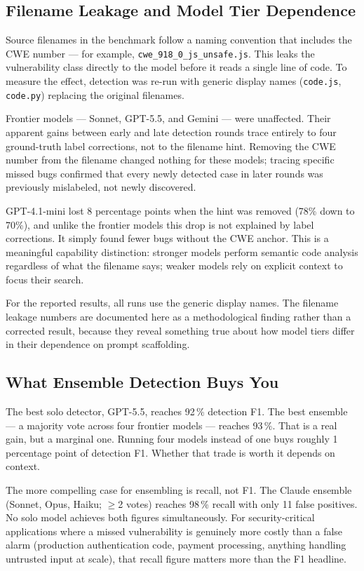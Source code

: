 \documentclass[12pt]{article}
\begin{document}
\subsection{Filename Leakage and Model Tier Dependence}

Source filenames in the benchmark follow a naming convention that includes the
CWE number — for example, \texttt{cwe\_918\_0\_js\_unsafe.js}. This leaks
the vulnerability class directly to the model before it reads a single line of
code. To measure the effect, detection was re-run with generic display names
(\texttt{code.js}, \texttt{code.py}) replacing the original filenames.

Frontier models — Sonnet, GPT-5.5, and Gemini — were unaffected. Their
apparent gains between early and late detection rounds trace entirely to four
ground-truth label corrections, not to the filename hint. Removing the CWE
number from the filename changed nothing for these models; tracing specific
missed bugs confirmed that every newly detected case in later rounds was
previously mislabeled, not newly discovered.

GPT-4.1-mini lost 8 percentage points when the hint was removed (78\% down
to 70\%), and unlike the frontier models this drop is not explained by label
corrections. It simply found fewer bugs without the CWE anchor. This is a
meaningful capability distinction: stronger models perform semantic code
analysis regardless of what the filename says; weaker models rely on
explicit context to focus their search.

For the reported results, all runs use the generic display names. The
filename leakage numbers are documented here as a methodological finding
rather than a corrected result, because they reveal something true about how
model tiers differ in their dependence on prompt scaffolding.

\subsection{What Ensemble Detection Buys You}

The best solo detector, GPT-5.5, reaches 92\,\% detection F1. The best
ensemble — a majority vote across four frontier models — reaches 93\,\%. That
is a real gain, but a marginal one. Running four models instead of one buys
roughly 1 percentage point of detection F1. Whether that trade is worth it
depends on context.

The more compelling case for ensembling is recall, not F1. The Claude ensemble
(Sonnet, Opus, Haiku; $\geq$2 votes) reaches 98\,\% recall with only 11 false
positives. No solo model achieves both figures simultaneously. For
security-critical applications where a missed vulnerability is genuinely more
costly than a false alarm (production authentication code, payment processing,
anything handling untrusted input at scale), that recall figure matters more
than the F1 headline.
\end{document}
